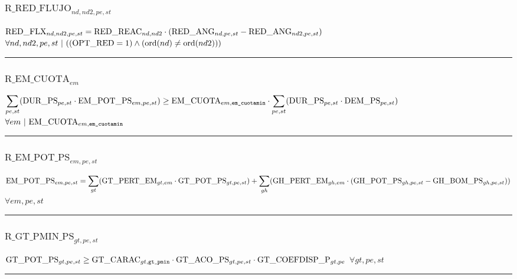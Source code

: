 \documentclass[11pt]{article}
\begin{document}
\subsubsection*{$\text{R\_RED\_FLUJO}_{nd, nd2, pe, st}$} \label{R_RED_FLUJO}
$
\textcolor{black}{\text{RED\_FLX}}_{nd, nd2, pe, st} = \textcolor{black}{\text{RED\_REAC}}_{nd, nd2} \cdot  ( \textcolor{black}{\text{RED\_ANG}}_{nd, pe, st} - \textcolor{black}{\text{RED\_ANG}}_{nd2, pe, st} ) 
$
\hfill
$
\forall{ nd, nd2, pe, st}  ~ | ~ (  ( \textcolor{black}{\text{OPT\_RED}}  =  1 )  \wedge  (  \text{ord}( nd )   \neq   \text{ord}( nd2 )  )  )
$ \\
\hrule 
\subsubsection*{$\text{R\_EM\_CUOTA}_{em}$} \label{R_EM_CUOTA}
$
\displaystyle \sum_{pe, st} ( \textcolor{black}{\text{DUR\_PS}}_{pe, st} \cdot \textcolor{black}{\text{EM\_POT\_PS}}_{em, pe, st} )  \geq \textcolor{black}{\text{EM\_CUOTA}}_{em, \texttt{em\_cuotamin}} \cdot \displaystyle \sum_{pe, st} ( \textcolor{black}{\text{DUR\_PS}}_{pe, st} \cdot \textcolor{black}{\text{DEM\_PS}}_{pe, st} ) 
$
\hfill
$
\forall{ em}  ~ | ~\textcolor{black}{\text{EM\_CUOTA}}_{em, \texttt{em\_cuotamin}}
$ \\
\hrule 
\subsubsection*{$\text{R\_EM\_POT\_PS}_{em, pe, st}$} \label{R_EM_POT_PS}
$
\textcolor{black}{\text{EM\_POT\_PS}}_{em, pe, st} = \displaystyle \sum_{gt} ( \textcolor{black}{\text{GT\_PERT\_EM}}_{gt, em} \cdot \textcolor{black}{\text{GT\_POT\_PS}}_{gt, pe, st} )  + \displaystyle \sum_{gh} ( \textcolor{black}{\text{GH\_PERT\_EM}}_{gh, em} \cdot  ( \textcolor{black}{\text{GH\_POT\_PS}}_{gh, pe, st} - \textcolor{black}{\text{GH\_BOM\_PS}}_{gh, pe, st} )  ) 
$
\hfill
$
\forall{ em, pe, st} 
$ \\
\hrule 
\subsubsection*{$\text{R\_GT\_PMIN\_PS}_{gt, pe, st}$} \label{R_GT_PMIN_PS}
$
\textcolor{black}{\text{GT\_POT\_PS}}_{gt, pe, st} \geq \textcolor{black}{\text{GT\_CARAC}}_{gt, \texttt{gt\_pmin}} \cdot \textcolor{black}{\text{GT\_ACO\_PS}}_{gt, pe, st} \cdot \textcolor{black}{\text{GT\_COEFDISP\_P}}_{gt, pe}
$
\hfill
$
\forall{ gt, pe, st} 
$ \\
\hrule 
\end{document}
